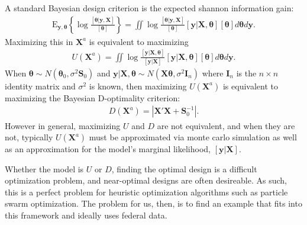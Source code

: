 \documentclass[12pt]{article}
\begin{document}
A standard Bayesian design criterion is the expected shannon information gain:
\begin{align*}
\mathrm{E}_{\bm{y},\bm{\theta}}\left\{\log \frac{[\bm{\theta}|\bm{y},\bm{X}]}{[\bm{\theta}]}\right\}    = \iint \log \frac{[\bm{\theta}|\bm{y},\bm{X}]}{[\bm{\theta}]} [\bm{y}|\bm{X},\bm{\theta}][\bm{\theta}] d\bm{\theta} d\bm{y}.
\end{align*}
Maximizing this in $\bm{X}^a$ is equivalent to maximizing
\begin{align*}
U(\bm{X}^a) = \iint \log \frac{[\bm{y}|\bm{X},\bm{\theta}]}{[\bm{y}|\bm{X}]} [\bm{y}|\bm{X},\bm{\theta}][\bm{\theta}] d\bm{\theta} d\bm{y}.
\end{align*}
When $\bm{\theta}\sim N(\bm{\theta}_0, \sigma^2\bm{S}_0)$ and $\bm{y}|\bm{X},\bm{\theta} \sim N(\bm{X}\bm{\theta}, \sigma^2\bm{I}_n)$ where $\bm{I}_n$ is the $n\times n$ identity matrix and $\sigma^2$ is known, then maximizing $U(\bm{X}^a)$ is equivalent to maximizing the Bayesian D-optimality criterion:
\begin{align*}
D(\bm{X}^{a}) = |\bm{X}'\bm{X} + \bm{S}_0^{-1}|.
\end{align*}
However in general, maximizing $U$ and $D$ are not equivalent, and when they are not, typically $U(\bm{X}^a)$ must be approximated via monte carlo simulation as well as an approximation for the model's marginal likelihood, $[\bm{y}|\bm{X}]$.

Whether the model is $U$ or $D$, finding the optimal design is a difficult optimization problem, and near-optimal designs are often desireable. As such, this is a perfect problem for heuristic optimization algorithms such as particle swarm optimization. The problem for us, then, is to find an example that fits into this framework and ideally uses federal data.
\end{document}
